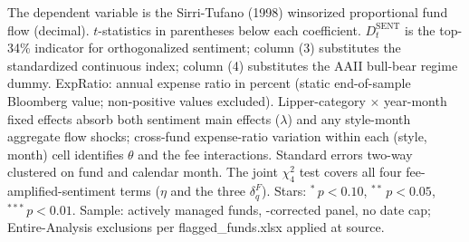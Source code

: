 \begin{table}[!htbp]
\begin{minipage}{\tabletempwidth}
\par\medskip
\begin{singlespace}\tablefont\noindent
The dependent variable is the Sirri-Tufano (1998) winsorized proportional fund flow (decimal). $t$-statistics in parentheses below each coefficient. $D^{\text{SENT}}_t$ is the top-34\% indicator for orthogonalized sentiment; column (3) substitutes the standardized continuous index; column (4) substitutes the AAII bull-bear regime dummy. ExpRatio: annual expense ratio in percent (static end-of-sample Bloomberg value; non-positive values excluded). Lipper-category $\times$ year-month fixed effects absorb both sentiment main effects ($\lambda$) and any style-month aggregate flow shocks; cross-fund expense-ratio variation within each (style, month) cell identifies $\theta$ and the fee interactions. Standard errors two-way clustered on fund and calendar month. The joint $\chi^2_4$ test covers all four fee-amplified-sentiment terms ($\eta$ and the three $\delta^F_q$). Stars: $^{*}\,p<0.10$, $^{**}\,p<0.05$, $^{***}\,p<0.01$. Sample: actively managed funds, \textcite{Evans2010}-corrected panel, no date cap; Entire-Analysis exclusions per flagged\_funds.xlsx applied at source.
\end{singlespace}
\end{minipage}
\end{table}

